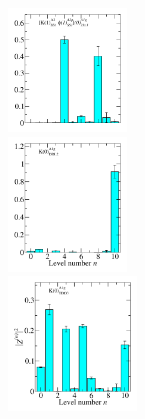 \begin{figure}
  \includegraphics[width=0.28\textwidth]{figures/spectrum_a1g/no_tq/zfactors/zfactor_isodoublet_kaon_phi-A1g_1-P001-A2-SS_1-P00-1-A2p-SS_1.pdf}\\
  \includegraphics[width=0.28\textwidth]{figures/spectrum_a1g/no_tq/zfactors/zfactor_kaon-P000-A1g_1-DDL_2.pdf}\\
  \includegraphics[width=0.304\textwidth]{figures/spectrum_a1g/no_tq/zfactors/zfactor_kaon-P000-A1g_1-TDO_3.pdf}

\end{figure}

